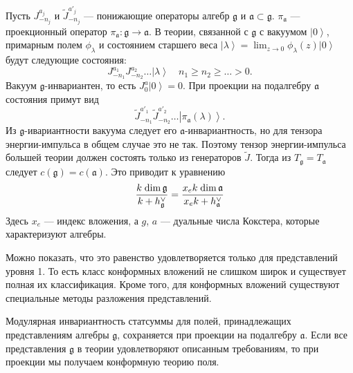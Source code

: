 Пусть $J^{a_j}_{-n_j}$ и $\tilde{J}^{a'_j}_{-n_j}$ --- понижающие операторы алгебр  $\mathfrak{g}$ и
$\mathfrak{a}\subset\mathfrak{g}$.  $\pi_{\mathfrak{a}}$ --- проекционный оператор
$\pi_{\mathfrak{a}}:\mathfrak{g}\longrightarrow \mathfrak{a}$. В теории, связанной с  $\mathfrak{g}$
с вакуумом $\left| 0\right>$, примарным полем $\phi_{\lambda}$ и состоянием старшего веса  $\left|\lambda\right>=\lim_{z\to 0} \phi_{\lambda}(z) \left|0\right>$ будут следующие состояния:
\begin{equation}
  \label{eq:109}
  J^{a_1}_{-n_1}J^{a_2}_{-n_2}\dots\left|\lambda\right>\quad n_1\geq n_2\geq \dots>0.
\end{equation}
Вакуум $\mathfrak{g}$-инвариантен, то есть $J_0^a\left|0\right>=0$. При проекции на подалгебру
$\mathfrak{a}$ состояния примут вид
\begin{equation}
  \label{eq:110}
  \tilde{J}^{a'_1}_{-n_1}\tilde{J}^{a'_2}_{-n_2}\dots\left|\pi_{\mathfrak{a}}(\lambda)\right>.
\end{equation}
Из $\mathfrak{g}$-ивариантности вакуума следует его $\mathfrak{a}$-инвариантность, но для тензора
энергии-импульса в общем случае это не так. Поэтому тензор энергии-импульса большей теории должен
состоять только из генераторов $\tilde{J}$. Тогда из $T_{\mathfrak{g}}=T_{\mathfrak{a}}$ следует $c(\mathfrak{g})=c(\mathfrak{a})$. Это приводит к уравнению
\begin{equation}
  \label{eq:111}
  \frac{k\;\mathrm{dim}\,\mathfrak{g}}{k+h^{\vee}_{\mathfrak{g}}}=\frac{x_e k\; \mathrm{dim}\,\mathfrak{a}}{x_ek+h^{\vee}_{\mathfrak{a}}}
\end{equation}
Здесь $x_e$ --- индекс вложения, а  $g$, $a$ --- дуальные числа Кокстера, которые характеризуют алгебры.

Можно показать, что это равенство удовлетворяется только для представлений уровня 1. То есть класс
конформных вложений не слишком широк и существует полная их классификация. Кроме того, для
конформных вложений существуют специальные методы разложения представлений.

Модулярная инвариантность статсуммы для полей, принадлежащих представлениям алгебры  $\mathfrak{g}$,
сохраняется при проекции на подалгебру $\mathfrak{a}$. Если все представления $\mathfrak{g}$ в теории
удовлетворяют описанным требованиям, то при проекции мы получаем конформную теорию поля.

